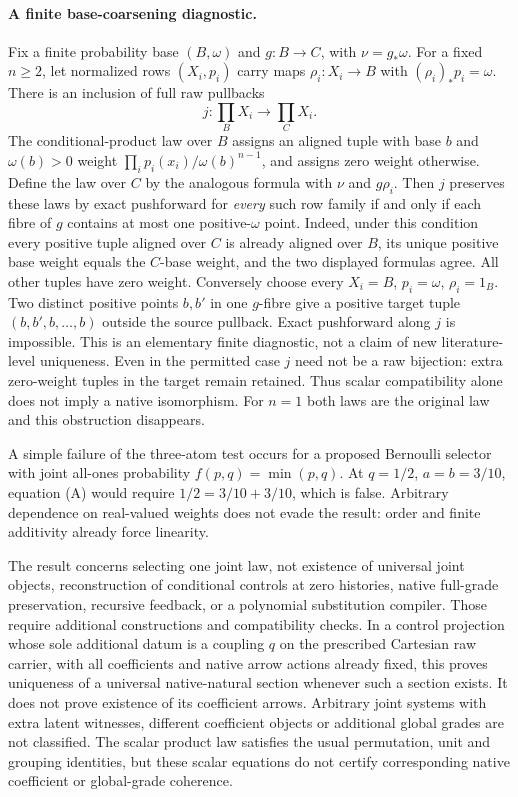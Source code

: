 \documentclass{article}
\begin{document}
\paragraph{A finite base-coarsening diagnostic.}
Fix a finite probability base $(B,\omega)$ and $g:B\to C$, with
$\nu=g_*\omega$. For a fixed $n\geq2$, let normalized rows $(X_i,p_i)$
carry maps $\rho_i:X_i\to B$ with $(\rho_i)_*p_i=\omega$.
There is an inclusion of full raw pullbacks
\[
 j:\prod_B X_i\longrightarrow\prod_C X_i.
\]
The conditional-product law over $B$ assigns an aligned tuple with base $b$
and $\omega(b)>0$ weight
$\prod_i p_i(x_i)/\omega(b)^{n-1}$, and assigns zero weight otherwise.
Define the law over $C$ by the analogous formula with $\nu$ and $g\rho_i$.
Then $j$ preserves these laws by exact pushforward for \emph{every} such
row family if and only if each fibre of $g$ contains at most one
positive-$\omega$ point.
Indeed, under this condition every positive tuple aligned over $C$ is already
aligned over $B$, its unique positive base weight equals the $C$-base weight,
and the two displayed formulas agree. All other tuples have zero weight.
Conversely choose every $X_i=B$, $p_i=\omega$, $\rho_i=1_B$.
Two distinct positive points $b,b'$ in one $g$-fibre give a positive target
tuple $(b,b',b,\ldots,b)$ outside the source pullback. Exact pushforward
along $j$ is impossible. This is an elementary finite diagnostic, not a claim
of new literature-level uniqueness. Even in the permitted case $j$ need not
be a raw bijection: extra zero-weight tuples in the target remain retained.
Thus scalar compatibility alone does not imply a native isomorphism.
For $n=1$ both laws are the original law and this obstruction disappears.

A simple failure of the three-atom test occurs for a proposed Bernoulli
selector with joint all-ones probability $f(p,q)=\min(p,q)$.
At $q=1/2$, $a=b=3/10$, equation (A) would require
$1/2=3/10+3/10$, which is false. Arbitrary dependence on real-valued weights
does not evade the result: order and finite additivity already force linearity.

The result concerns selecting one joint law, not existence of universal joint
objects, reconstruction of conditional controls at zero histories, native
full-grade preservation, recursive feedback, or a polynomial substitution
compiler. Those require additional constructions and compatibility checks.
In a control projection whose sole additional datum is a coupling $q$ on
the prescribed Cartesian raw carrier, with all coefficients and native arrow
actions already fixed, this proves uniqueness of a universal native-natural
section whenever such a section exists. It does not prove existence of its
coefficient arrows. Arbitrary joint systems with extra latent witnesses,
different coefficient objects or additional global grades are not classified.
The scalar product law satisfies the usual permutation, unit and grouping
identities, but these scalar equations do not certify corresponding native
coefficient or global-grade coherence.
\end{document}

